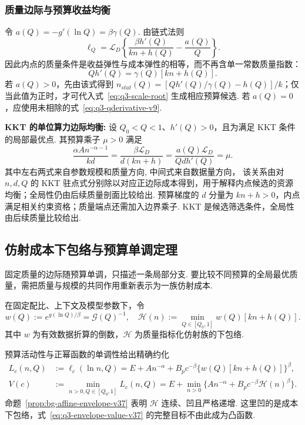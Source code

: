 \subsubsection{质量边际与预算收益均衡}
令 $a(Q)=-g'(\ln Q)=\beta\gamma(Q)$. 由链式法则
\begin{equation}\label{eq:q3-qderivative-v9}
\ell_Q=\mathcal L_D\left\{\frac{\beta h'(Q)}{kn+h(Q)}-\frac{a(Q)}Q\right\}.
\end{equation}
因此内点的质量条件是收益弹性与成本弹性的相等，而不再含单一常数质量指数：
\begin{equation}\label{eq:q3-quality-stationary}
Qh'(Q)=\gamma(Q)[kn+h(Q)].
\end{equation}
若 $a(Q)>0$，先由该式得到 $n_{stat}(Q)=[Qh'(Q)/\gamma(Q)-h(Q)]/k$；仅当此值为正时，才可代入式~\eqref{eq:q3-scale-root} 生成相应预算候选. 若 $a(Q)=0$，应使用未相除的式~\eqref{eq:q3-qderivative-v9}. 

\textbf{KKT 的单位算力边际均衡:}
设 $Q_0<Q<1$、$h'(Q)>0$，且为满足 KKT 条件的局部最优点. 其预算乘子 $\mu>0$ 满足
\begin{equation}\label{eq:q3-cost-marginal-v15}
\frac{\alpha An^{-\alpha-1}}{kd}
=\frac{\beta\mathcal L_D}{d(kn+h)}
=\frac{a(Q)\mathcal L_D}{Qdh'(Q)}=\mu.
\end{equation}
其中左右两式来自参数规模和质量方向, 中间式来自数据量方向，
该关系由对 $n,d,Q$ 的 KKT 驻点式分别除以对应正边际成本得到，用于解释内点候选的资源均衡；全局性仍由后续质量剖面比较给出. 
预算梯度的 $d$ 分量为 $kn+h>0$，内点满足相关约束资格；质量端点还需加入边界乘子. KKT 是候选筛选条件，全局性由后续质量比较给出. 

\subsection{仿射成本下包络与预算单调定理}\label{sec:q3-global-envelope-v37}

固定质量的边际随预算单调，只描述一条局部分支. 要比较不同预算的全局最优质量，需把质量与规模的共同作用重新表示为一族仿射成本. 

\begin{definition}[有效质量成本的下包络]\label{def:q3-quality-envelope-v37}
在固定配比、上下文及模型参数下，令
\begin{equation}\label{eq:q3-quality-envelope-v37}
w(Q):=e^{g(\ln Q)/\beta}=\mathcal G(Q)^{-1},\quad
\mathscr H(n):=\min_{Q\in[Q_0,1]}w(Q)[kn+h(Q)].
\end{equation}
其中 $w$ 为有效数据折算的倒数，$\mathscr H$ 为质量指标化仿射族的下包络. 
\end{definition}
预算活动性与正幂函数的单调性给出精确约化
\begin{subequations}\label{eq:q3-envelope-value-v37}
\begin{align}
L_c(n,Q)&:=\ell_c(\ln n,Q)
=E+An^{-\alpha}+B_pc^{-\beta}\{w(Q)[kn+h(Q)]\}^{\beta},\\
V(c)&:=\min_{n>0,Q\in[Q_0,1]}L_c(n,Q)
=E+\min_{n>0}\{An^{-\alpha}+B_pc^{-\beta}\mathscr H(n)^\beta\}.
\end{align}
\end{subequations}
命题~\ref{prop:bg-affine-envelope-v37} 表明 $\mathscr H$ 连续、凹且严格递增. 这里凹的是成本下包络，式~\eqref{eq:q3-envelope-value-v37} 的完整目标不由此成为凸函数. 

